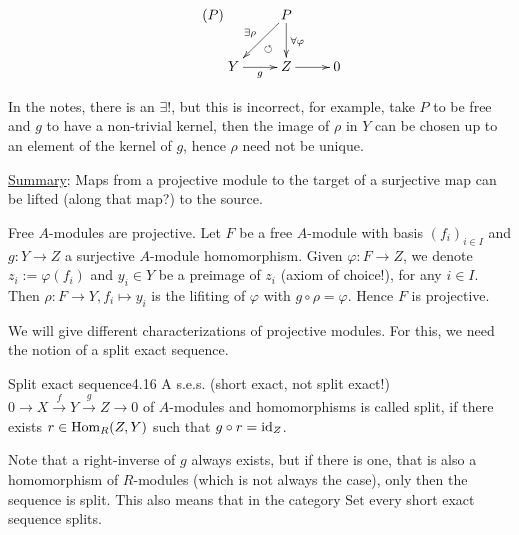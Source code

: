 \documentclass[twoside = false,	%
		headsepline,		%
		parskip = true,
		]{scrbook}						%
\begin{document}
    \begin{equation}\tag{$P$}\label{proj}
    \xymatrix {
        & P \ar[d]^{\forall \varphi} \ar[dl]_{\exists \rho}^{\circlearrowleft} \\
        Y \ar[r]_g & Z \ar[r] & 0
    }
    \end{equation}

    In the notes, there is an $\exists!$, but this is incorrect, for example, take $P$ to be free and $g$ to have a non-trivial kernel, then the image of $\rho$ in $Y$ can be chosen up to an element of the kernel of $g$, hence $\rho$ need not be unique.

    \underline{Summary}: Maps from a projective module to the target of a surjective map can be lifted (along that map?) to the source.

    \begin{example}{}{}
        Free $A$-modules are projective. Let $F$ be a free $A$-module with basis $(f_i)_{i \in I}$ and $g: Y \to Z$ a surjective $A$-module homomorphism. Given $\varphi: F \to Z$, we denote $z_i:= \varphi(f_i)$ and $y_i \in Y$ be a preimage of $z_i$ (axiom of choice!), for any $i \in I$. Then $\rho: F \to Y, f_i \mapsto y_i$ is the lifiting of $\varphi$ with $g \circ \rho = \varphi$. Hence $F$ is projective.
    \end{example}

    We will give different characterizations of projective modules. For this, we need the notion of a split exact sequence.

    \begin{definition}{Split exact sequence}{4.16}
        A s.e.s. (short exact, not split exact!) $0 \to X \xrightarrow{f} Y \xrightarrow{g} Z \to 0$ of $A$-modules and homomorphisms is called split, if there exists $r \in \mathrm{Hom}_R(Z,Y)$ such that $g \circ r = \mathrm{id}_Z$.
    \end{definition}

    Note that a right-inverse of $g$ always exists, but if there is one, that is also a homomorphism of $R$-modules (which is not always the case), only then the sequence is split. This also means that in the category $\mathrm{Set}$ every short exact sequence splits.
\end{document}
